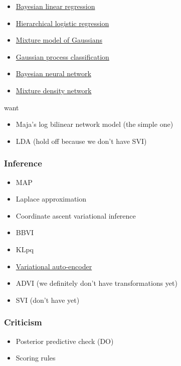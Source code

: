 \begin{itemize}
\item
  \href{https://github.com/blei-lab/edward/blob/master/examples/bayesian_linear_regression.py}{Bayesian
  linear regression}
\item
  \href{https://github.com/blei-lab/edward/blob/master/examples/hierarchical_logistic_regression.py}{Hierarchical
  logistic regression}
\item
  \href{https://github.com/blei-lab/edward/blob/master/examples/mixture_gaussian.py}{Mixture
  model of Gaussians}
\item
  \href{https://github.com/blei-lab/edward/blob/master/examples/gp_classification.py}{Gaussian
  process classification}
\item
  \href{https://github.com/blei-lab/edward/blob/master/examples/bayesian_nn.py}{Bayesian
  neural network}
\item
  \href{https://github.com/blei-lab/edward/blob/master/examples/mixture_density_network.py}{Mixture
  density network}
\end{itemize}

want

\begin{itemize}
  \item Maja's log bilinear network model (the simple one)
  \item LDA (hold off because we don't have SVI)
\end{itemize}

\subsubsection{Inference}

\begin{itemize}
  \item MAP
  \item Laplace approximation
  \item Coordinate ascent variational inference
  \item BBVI
  \item KLpq
  \item
  \href{https://github.com/blei-lab/edward/blob/master/examples/convolutional_vae.py}{Variational
  auto-encoder}
  \item ADVI (we definitely don't have transformations yet)
  \item SVI (don't have yet)
\end{itemize}

\subsubsection{Criticism}

\begin{itemize}
  \item Posterior predictive check (DO)
  \item Scoring rules
\end{itemize}
